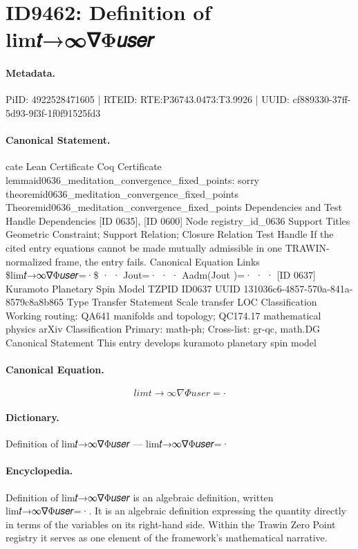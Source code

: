 \section*{ID9462: Definition of lim𝑡→∞∇Φ𝑢𝑠𝑒𝑟}
\paragraph{Metadata.}
PiID: 4922528471605 | RTEID: RTE:P36743.0473:T3.9926 | UUID: cf889330-37ff-5d93-9f3f-1f0f91525fd3

\paragraph{Canonical Statement.}
cate Lean Certificate Coq Certificate lemmaid0636\_meditation\_convergence\_fixed\_points: sorry theoremid0636\_meditation\_convergence\_fixed\_points Theoremid0636\_meditation\_convergence\_fixed\_points Dependencies and Test Handle Dependencies [ID 0635], [ID 0600] Node registry\_id\_0636 Support Titles Geometric Constraint; Support Relation; Closure Relation Test Handle If the cited entry equations cannot be made mutually admissible in one TRAWIN-normalized frame, the entry fails. Canonical Equation Links \$lim𝑡→∞∇Φ𝑢𝑠𝑒𝑟=·\$ · · Jout=· · · Aadm(Jout )=· · · [ID 0637] Kuramoto Planetary Spin Model TZPID ID0637 UUID 131036c6-4857-570a-841a-8579c8a8b865 Type Transfer Statement Scale transfer LOC Classification Working routing: QA641 manifolds and topology; QC174.17 mathematical physics arXiv Classification Primary: math-ph; Cross-list: gr-qc, math.DG Canonical Statement This entry develops kuramoto planetary spin model

\paragraph{Canonical Equation.}
\[
lim𝑡→∞∇Φ𝑢𝑠𝑒𝑟=·
\]

\paragraph{Dictionary.}
Definition of lim𝑡→∞∇Φ𝑢𝑠𝑒𝑟 — lim𝑡→∞∇Φ𝑢𝑠𝑒𝑟=·

\paragraph{Encyclopedia.}
Definition of lim𝑡→∞∇Φ𝑢𝑠𝑒𝑟 is an algebraic definition, written lim𝑡→∞∇Φ𝑢𝑠𝑒𝑟=·. It is an algebraic definition expressing the quantity directly in terms of the variables on its right-hand side. Within the Trawin Zero Point registry it serves as one element of the framework's mathematical narrative.
